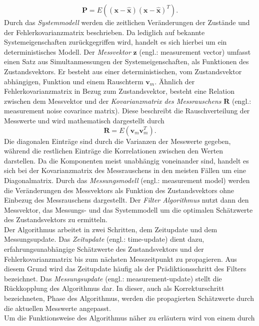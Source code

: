 \begin{equation}\label{P}
  \mathbf{P} = E((\mathbf{x} - \mathbf{\hat x})(\mathbf{x} - \mathbf{\hat x})^T)   .
\end{equation}
Durch das \textit{Systemmodell} werden die zeitlichen Veränderungen der Zustände und der Fehlerkovarianzmatrix beschrieben. Da lediglich auf bekannte Systemeigenschaften zurückgegriffen wird, handelt es sich hierbei um ein deterministisches Modell.
Der \textit{Messvektor} $\mathbf{z}$ (engl.: measurement vector) umfasst einen Satz aus Simultanmessungen der Systemeigenschaften, als Funktionen des Zustandsvektors. Er besteht aus einer deterministischen, vom Zustandsvektor abhängigen, Funktion und einem Rauschterm $\mathbf{v}_m$. Ähnlich der Fehlerkovarianzmatrix in Bezug zum Zustandsvektor, besteht eine Relation zwischen dem Messvektor und der \textit{Kovarianzmatrix des Messrauschens} $\mathbf{R}$ (engl.: measurement noise covarince matrix). Diese beschreibt die Rauschverteilung der Messwerte und wird mathematisch dargestellt durch
\begin{equation}\label{R}
  \mathbf{R} = E(\mathbf{v}_m \mathbf{v}_m^T)   .
\end{equation}
 Die diagonalen Einträge sind durch die Varianzen der Messwerte gegeben, während die restlichen Einträge die Korrelationen zwischen den Werten darstellen. Da die Komponenten meist unabhängig voneinander sind, handelt es sich bei der Kovarianzmatrix des Messrauschens in den meisten Fällen um eine Diagonalmatrix.
Durch das \textit{Messungsmodell} (engl.: measurement model) werden die Veränderungen des Messvektors als Funktion des Zustandsvektors ohne Einbezug des Messrauschens dargestellt.
Der \textit{Filter Algorithmus} nutzt dann den Messvektor, das Messungs- und das Systemmodell um die optimalen Schätzwerte des Zustandsvektors zu ermitteln. \cite{P32}
\\Der Algorithmus arbeitet in zwei Schritten, dem Zeitupdate und dem Messungsupdate. Das \textit{Zeitupdate} (engl.: time-update) dient dazu, erfahrungsunabhängige Schätzwerte des Zustandsvektors und der Fehlerkovarianzmatrix bis zum nächsten Messzeitpunkt zu propagieren. Aus diesem Grund wird das Zeitupdate häufig als der Prädiktionsschritt des Filters bezeichnet.
Das \textit{Messungsupdate} (engl.: measurement-update) stellt die Rückkopplung des Algorithmus dar. In dieser, auch als Korrekturschritt bezeichneten, Phase des Algorithmus, werden die propagierten Schätzwerte durch die aktuellen Messwerte angepasst. \cite{P24}
\\Um die Funktionsweise des Algorithmus näher zu erläutern wird von einem durch
